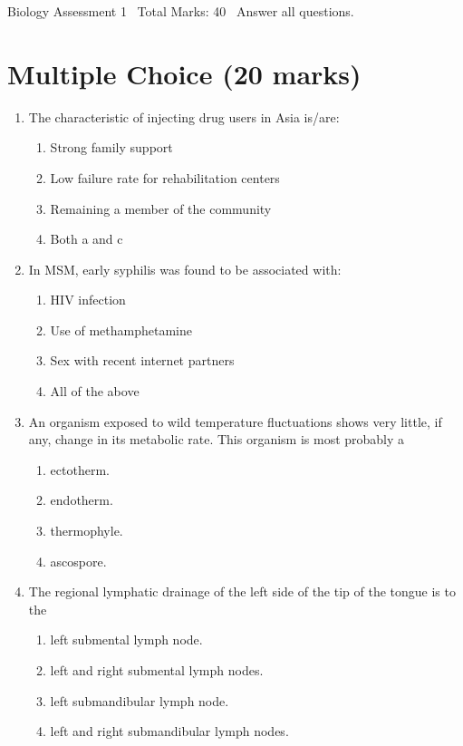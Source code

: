 \documentclass[12pt]{article}
\begin{document}
\begin{center}
Biology Assessment 1 \
Total Marks: 40 \
Answer all questions.
\end{center}

\section*{Multiple Choice (20 marks)}
\begin{enumerate}[label=\arabic*.]
\item The characteristic of injecting drug users in Asia is/are:
\begin{enumerate}[label=(\alph*)]
    \item Strong family support
    \item Low failure rate for rehabilitation centers
    \item Remaining a member of the community
    \item Both a and c
\end{enumerate}
\item In MSM, early syphilis was found to be associated with:
\begin{enumerate}[label=(\alph*)]
    \item HIV infection
    \item Use of methamphetamine
    \item Sex with recent internet partners
    \item All of the above
\end{enumerate}
\item An organism exposed to wild temperature fluctuations shows very little, if any, change in its metabolic rate. This organism is most probably a
\begin{enumerate}[label=(\alph*)]
    \item ectotherm.
    \item endotherm.
    \item thermophyle.
    \item ascospore.
\end{enumerate}
\item The regional lymphatic drainage of the left side of the tip of the tongue is to the
\begin{enumerate}[label=(\alph*)]
    \item left submental lymph node.
    \item left and right submental lymph nodes.
    \item left submandibular lymph node.
    \item left and right submandibular lymph nodes.

\end{enumerate}
\end{enumerate}
\end{document}
